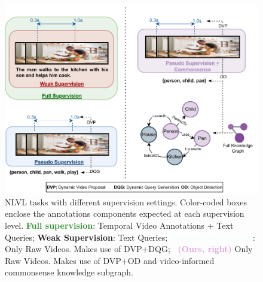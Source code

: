 \begin{figure}[t!]
    \centering
    \includegraphics[width=0.9\linewidth]{figures/figure_files/Teaser.pdf}
    \caption{NLVL tasks with different supervision settings.
    Color-coded boxes enclose the annotations components expected at each supervision level. \textbf{\textcolor{ForestGreen}{Full supervision}}: Temporal Video Annotations + Text Queries; \textbf{\textcolor{BrickRed}{Weak Supervision}}: Text Queries; \textbf{\textcolor{Azure}{Pseudo-Supervision}}: Only Raw Videos. Makes use of DVP+DQG; \textbf{\textcolor{Plum}{\modelname~(Ours, right)}} Only Raw Videos. Makes use of DVP+OD and video-informed commonsense knowledge subgraph.}
    \label{fig:teaser}
    
\end{figure}